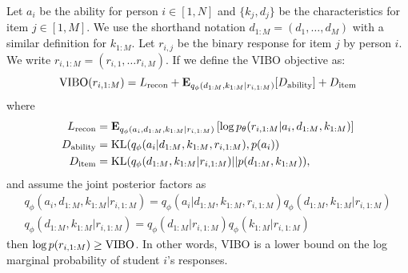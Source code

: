 \begin{thm}
    Let $a_i$ be the ability for person $i \in [1, N]$ and $\{k_j,d_j\}$ be the characteristics for item $j \in [1, M]$. We use the shorthand notation $d_{1:M} = (d_1, \ldots, d_M)$ with a similar definition for $k_{1:M}$. Let $r_{i,j}$ be the binary response for item $j$ by person $i$. We write $r_{i, 1:M} = (r_{i,1}, \ldots r_{i,M})$.
    If we define the VIBO objective as:
    \begin{equation}
        \textup{VIBO}(r_{i,1:M}) = L_{\text{recon}} + \mathbf{E}_{q_\phi(d_{1:M},k_{1:M}|r_{i,1:M})}[D_{\text{ability}}] +D_{\text{item}}
        \label{eq:vibo:og}
    \end{equation}
    where
    \begin{align*}
        L_{\text{recon}} &= \mathbf{E}_{q_\phi(a_i, d_{1:M}, k_{1:M}|r_{i,1:M})}\left[ \log p_\theta(r_{i,1:M}|a_i, d_{1:M}, k_{1:M}) \right] \\
        D_{\text{ability}} &= \textup{KL}(q_\phi(a_i|d_{1:M},k_{1:M}, r_{i,1:M}), p(a_i)) \\
        D_{\text{item}} &= \textup{KL}(q_\phi(d_{1:M},k_{1:M}|r_{i,1:M})||p(d_{1:M}, k_{1:M})),
    \end{align*}
    and assume the joint posterior factors as 
    \begin{align}
        q_\phi(a_i, d_{1:M}, k_{1:M}|r_{i,1:M}) = q_\phi(a_i|d_{1:M},k_{1:M},r_{i,1:M})q_\phi(d_{1:M},k_{1:M}|r_{i,1:M}) \\
        q_\phi(d_{1:M},k_{1:M}|r_{i,1:M}) = q_\phi(d_{1:M}|r_{i,1:M})q_\phi(k_{1:M}|r_{i,1:M}) 
    \end{align}
    then $\log p(r_{i,1:M}) \geq \textup{VIBO}$. In other words, VIBO is a lower bound on the log marginal probability of student $i$'s responses.
    \label{thm:virtu}
\end{thm}

